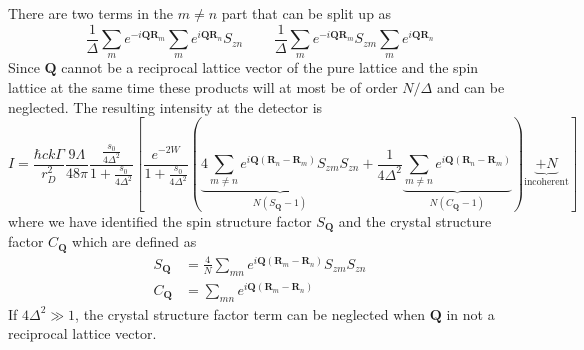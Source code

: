 \documentclass[11pt,letter]{article}
\newcommand{\bv}[1]{\ensuremath{\bm{#1}}}
\begin{document}
There are two terms in the $m\neq n$  part that can be split up as 
\begin{equation}
  \frac{1}{\Delta} 
  \sum_{m} 
       e^{ -i \bv{Q} \bv{R}_{m}  }  
  \sum_{m} 
       e^{ i \bv{Q} \bv{R}_{n}  }  
      S_{zn} \ \ \ \ \ \ \ \ \ \ 
  \frac{1}{\Delta} 
  \sum_{m} 
       e^{ -i \bv{Q} \bv{R}_{m}  }  
       S_{zm}
  \sum_{m} 
       e^{ i \bv{Q} \bv{R}_{n}  }  
\end{equation} 
Since $\bv{Q}$ cannot be a reciprocal lattice vector of the pure lattice and
the spin lattice at the same time these products will at most be of order
$N/\Delta$ and can be neglected.   The resulting intensity at the detector is  
\begin{equation}
 I  = 
 \frac{\hbar c k \Gamma}{r_{D}^{2}}  
    \frac{9\Lambda}{48\pi}
    \frac{ \frac{ s_{0}}{ 4\Delta^{2}}}
           {1+\frac{ s_{0}}{ 4\Delta^{2}} }
  \left[ 
    \frac{ e^{-2W}}
           {1+\frac{ s_{0}}{ 4\Delta^{2}} }
   \left( 
 \underbrace{  
  4 \sum_{m\neq n} 
       e^{ i \bv{Q}( \bv{R}_{n} - \bv{R}_{m} ) }  
     S_{zm}S_{zn}  }_{ N (S_{\bv{Q}} - 1)} 
  + 
         \frac{ 1}{4\Delta^{2}}
 \underbrace{  
 \sum_{m\neq n} 
       e^{ i \bv{Q}( \bv{R}_{n} - \bv{R}_{m} ) }  }_{  N( C_{\bv{Q}}-1) }
   \right) 
 \underbrace{  + N  }_{\text{incoherent}}
  \right]
\label{eq:iscatt-large-detuning}
\end{equation}
where we have identified the spin structure factor $S_{\bv{Q}}$ and the crystal
structure factor $C_{\bv{Q}}$ which are defined as 
\begin{align} 
  S_{\bv{Q}}  & = \frac{ 4 }{N} \sum_{mn} e^{i\bv{Q} ( \bv{R}_{m} - \bv{R}_{n} ) }  
               S_{zm} S_{zn}   \\
  C_{\bv{Q}}  & =  \sum_{mn}  e^{i\bv{Q} ( \bv{R}_{m} - \bv{R}_{n} ) }  
\end{align} 
If  $4\Delta^{2} \gg 1 $, the crystal structure factor term can be neglected
when $\bv{Q}$ in not a reciprocal lattice vector.     
  
\end{document}

